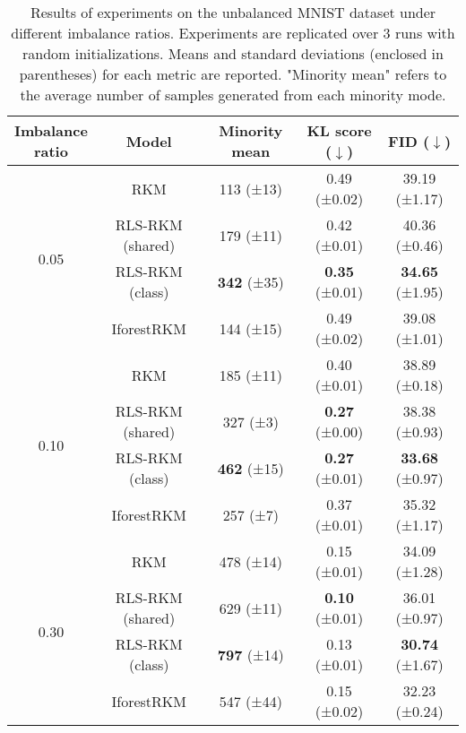 \begin{table}[ht]
    \centering
    \begin{tabular}{ccccc}
\toprule
\makecell{Imbalance \\ ratio} & Model & Minority mean & KL score ($\downarrow$) & FID ($\downarrow$) \\
\midrule
\multirow{4}{*}{0.05} & RKM & 113 (±13) & 0.49 (±0.02) & 39.19 (±1.17) \\
& RLS-RKM (shared) & 179 (±11) & 0.42 (±0.01) & 40.36 (±0.46) \\
& RLS-RKM (class) & \textbf{342} (±35) & \textbf{0.35} (±0.01) & \textbf{34.65} (±1.95) \\
& IforestRKM & 144 (±15) & 0.49 (±0.02) & 39.08 (±1.01) \\
\midrule
\multirow{4}{*}{0.10} & RKM & 185 (±11) & 0.40 (±0.01) & 38.89 (±0.18) \\
& RLS-RKM (shared) & 327 (±3) & \textbf{0.27} (±0.00) & 38.38 (±0.93) \\
& RLS-RKM (class) & \textbf{462} (±15) & \textbf{0.27} (±0.01) & \textbf{33.68} (±0.97) \\
& IforestRKM & 257 (±7) & 0.37 (±0.01) & 35.32 (±1.17) \\
\midrule
\multirow{4}{*}{0.30} & RKM & 478 (±14) & 0.15 (±0.01) & 34.09 (±1.28) \\
& RLS-RKM (shared) & 629 (±11) & \textbf{0.10} (±0.01) & 36.01 (±0.97) \\
& RLS-RKM (class) & \textbf{797} (±14) & 0.13 (±0.01) & \textbf{30.74} (±1.67) \\
& IforestRKM & 547 (±44) & 0.15 (±0.02) & 32.23 (±0.24) \\
\bottomrule
\end{tabular}
    \caption{Results of experiments on the unbalanced MNIST dataset under different imbalance ratios. Experiments are replicated over 3 runs with random initializations. Means and standard deviations (enclosed in parentheses) for each metric are reported. "Minority mean" refers to the average number of samples generated from each minority mode.
}
    \label{rls-expr-mnist}
\end{table}

